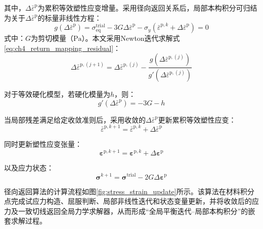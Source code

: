 其中，$\Delta\bar{\varepsilon}^{\mathrm{p}}$为累积等效塑性应变增量。采用径向返回关系后，局部本构积分可归结为关于$\Delta\bar{\varepsilon}^{\mathrm{p}}$的标量非线性方程：
\begin{equation}
	g\left(\Delta\bar{\varepsilon}^{\mathrm{p}}\right)
	=
	\sigma_{\mathrm{eq}}^{\mathrm{trial}}
	-
	3G\Delta\bar{\varepsilon}^{\mathrm{p}}
	-
	\sigma_y
	\left(
	\bar{\varepsilon}^{\mathrm p,k}
	+\Delta\bar{\varepsilon}^{\mathrm{p}}
	\right)
	=0
	\label{eq:ch4_return_mapping_residual}
\end{equation}
\noindent 式中：$G$为剪切模量（$\mathrm{Pa}$）。本文采用Newton迭代求解式\eqref{eq:ch4_return_mapping_residual}：
\begin{equation}
	\Delta\bar{\varepsilon}^{\mathrm p,(j+1)}
	=
	\Delta\bar{\varepsilon}^{\mathrm p,(j)}
	-
	\frac{
		g\!\left(
		\Delta\bar{\varepsilon}^{\mathrm p,(j)}
		\right)
	}{
		g'\!\left(
		\Delta\bar{\varepsilon}^{\mathrm p,(j)}
		\right)
	}
	\label{eq:ch4_return_newton}
\end{equation}

对于等效硬化模型，若硬化模量为$h$，则：
\begin{equation}
	g'\left(\Delta\bar{\varepsilon}^{\mathrm{p}}\right)
	=
	-3G-h
	\label{eq:ch4_return_derivative}
\end{equation}

当局部残差满足给定收敛准则后，采用收敛的$\Delta\bar{\varepsilon}^{\mathrm{p}}$更新累积等效塑性应变：
\begin{equation}
	\bar{\varepsilon}^{\mathrm p,k+1}
	=
	\bar{\varepsilon}^{\mathrm p,k}
	+
	\Delta\bar{\varepsilon}^{\mathrm{p}}
	\label{eq:ch4_equivalent_plastic_strain_update}
\end{equation}

同时更新塑性应变张量：
\begin{equation}
	\boldsymbol{\varepsilon}^{\mathrm p,k+1}
	=
	\boldsymbol{\varepsilon}^{\mathrm p,k}
	+
	\Delta\boldsymbol{\varepsilon}^{\mathrm{p}}
	\label{eq:ch4_plastic_strain_update}
\end{equation}

以及应力状态：
\begin{equation}
	\boldsymbol{\sigma}^{k+1}
	=
	\boldsymbol{\sigma}^{\mathrm{trial}}
	-
	2G\Delta\boldsymbol{\varepsilon}^{\mathrm{p}}
	\label{eq:ch4_stress_update}
\end{equation}

径向返回算法的计算流程如图\ref{fig:stress_strain_update}所示。该算法在材料积分点完成试应力构造、屈服判断、局部非线性迭代和状态变量更新，并将收敛后的应力及一致切线返回全局力学求解器，从而形成“全局平衡迭代--局部本构积分”的嵌套求解过程。

